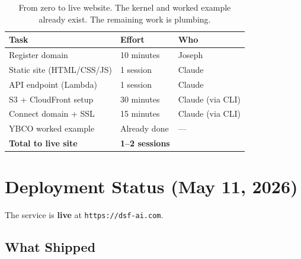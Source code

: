 \documentclass[11pt,letterpaper]{article}
\begin{document}
\begin{table}[h]
\centering
\begin{tabular}{@{}lll@{}}
\toprule
\textbf{Task} & \textbf{Effort} & \textbf{Who} \\
\midrule
Register domain & 10 minutes & Joseph \\
Static site (HTML/CSS/JS) & 1 session & Claude \\
API endpoint (Lambda) & 1 session & Claude \\
S3 + CloudFront setup & 30 minutes & Claude (via CLI) \\
Connect domain + SSL & 15 minutes & Claude (via CLI) \\
YBCO worked example & Already done & --- \\
\midrule
\textbf{Total to live site} & \textbf{1--2 sessions} & \\
\bottomrule
\end{tabular}
\caption{From zero to live website. The kernel and worked example
already exist. The remaining work is plumbing.}
\end{table}

\section{Deployment Status (May 11, 2026)}

The service is \textbf{live} at \texttt{https://dsf-ai.com}.

\subsection{What Shipped}
\end{document}
